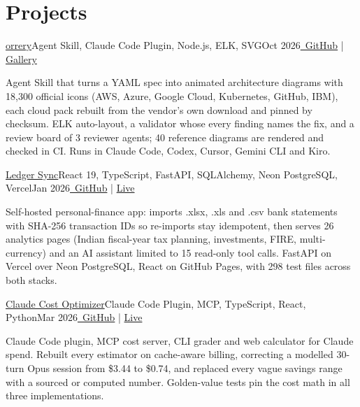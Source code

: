 \section{\textbf{Projects}}
\vspace{-2pt}
\resumeSubHeadingListStart

\resumeExp
{\href{https://sagargupta.online/orrery/}{orrery}}{Agent Skill, Claude Code Plugin, Node.js, ELK, SVG}{Oct 2026}{\href{https://github.com/Sagargupta16/orrery}{\faGithub\ GitHub} | \href{https://sagargupta.online/orrery/gallery/}{Gallery}}
\resumeItemListStart
    \item[$\diamond$] Agent Skill that turns a YAML spec into animated architecture diagrams with 18,300 official icons (AWS, Azure, Google Cloud, Kubernetes, GitHub, IBM), each cloud pack rebuilt from the vendor's own download and pinned by checksum. ELK auto-layout, a validator whose every finding names the fix, and a review board of 3 reviewer agents; 40 reference diagrams are rendered and checked in CI. Runs in Claude Code, Codex, Cursor, Gemini CLI and Kiro.
\resumeItemListEnd

\resumeExp
{\href{https://sagargupta.online/ledger-sync/}{Ledger Sync}}{React 19, TypeScript, FastAPI, SQLAlchemy, Neon PostgreSQL, Vercel}{Jan 2026}{\href{https://github.com/Sagargupta16/ledger-sync}{\faGithub\ GitHub} | \href{https://sagargupta.online/ledger-sync/}{Live}}
\resumeItemListStart
    \item[$\diamond$] Self-hosted personal-finance app: imports .xlsx, .xls and .csv bank statements with SHA-256 transaction IDs so re-imports stay idempotent, then serves 26 analytics pages (Indian fiscal-year tax planning, investments, FIRE, multi-currency) and an AI assistant limited to 15 read-only tool calls. FastAPI on Vercel over Neon PostgreSQL, React on GitHub Pages, with 298 test files across both stacks.
\resumeItemListEnd

\resumeExp
{\href{https://sagargupta.online/claude-cost-optimizer/}{Claude Cost Optimizer}}{Claude Code Plugin, MCP, TypeScript, React, Python}{Mar 2026}{\href{https://github.com/Sagargupta16/claude-cost-optimizer}{\faGithub\ GitHub} | \href{https://sagargupta.online/claude-cost-optimizer/}{Live}}
\resumeItemListStart
    \item[$\diamond$] Claude Code plugin, MCP cost server, CLI grader and web calculator for Claude spend. Rebuilt every estimator on cache-aware billing, correcting a modelled 30-turn Opus session from \$3.44 to \$0.74, and replaced every vague savings range with a sourced or computed number. Golden-value tests pin the cost math in all three implementations.
\resumeItemListEnd

